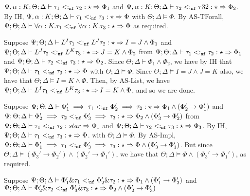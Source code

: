   $\Psi, \alpha : K ; \Theta ; \Delta \vdash \tau_1 <:_{\texttt{nf}} \tau_2 : \star \Rightarrow \Phi_1$ and
  $\Psi, \alpha : K ; \Theta ; \Delta \vdash \tau_2 <:_{\texttt{nf}} \tau32 : \star \Rightarrow \Phi_2$.
  By IH, $\Psi, \alpha : K ; \Theta ; \Delta \vdash \tau_1 <:_{\texttt{nf}} \tau_3 : \star \Rightarrow \Phi$ with $\Theta ; \Delta \vDash \Phi$. By AS-TForall,
  $\Psi ; \Theta ; \Delta \vdash \forall \alpha : K. \tau_1 <:_{\texttt{nf}} \forall \alpha : K. \tau_3 : \star \Rightarrow \Phi$ as required.
  \item[(AS-List)] Suppose $\Psi ; \Theta ; \Delta \vdash L^I \tau_1 <:_{\texttt{nf}} L^J \tau_2 : \star \Rightarrow I = J \wedge \Phi_1$ and
  $\Psi ; \Theta ; \Delta \vdash L^J \tau_2 <:_{\texttt{nf}} L^K \tau_3 : \star \Rightarrow J = K \wedge \Phi_2$
  from $\Psi ; \Theta ; \Delta \vdash \tau_1 <:_{\texttt{nf}} \tau_2 : \star \Rightarrow \Phi_1$ and
  $\Psi ; \Theta ; \Delta \vdash \tau_2 <:_{\texttt{nf}} \tau_3 : \star \Rightarrow \Phi_2$. Since $\Theta ; \Delta \vdash \Phi_1 \wedge \Phi_2$, we have by IH that
  $\Psi ; \Theta ; \Delta \vdash \tau_1 <:_{\texttt{nf}} \tau_3 : \star \Rightarrow \Phi$ with $\Theta ; \Delta \vDash \Phi$. Since $\Theta ; \Delta \vDash I = J \wedge J = K$ also,
  we have that $\Theta ; \Delta \vDash I = K \wedge \Phi$. Then, by AS-List, we have
  $\Psi ; \Theta ; \Delta \vdash L^I \tau_1 <:_{\texttt{nf}} L^K \tau_3 : \star \Rightarrow I = K \wedge \Phi$, and so we are done.
  \item[(AS-Impl)] Suppose $\Psi ; \Theta ; \Delta \vdash \Phi_1' \implies \tau_1 <:_{\texttt{nf}} \Phi_2' \implies \tau_2 : \star \Rightarrow \Phi_1 \wedge (\Phi_2' \to \Phi_1')$
  and $\Psi ; \Theta ; \Delta \vdash \Phi_2' \implies \tau_2 <:_{\texttt{nf}} \Phi_3' \implies \tau_3 : \star \Rightarrow \Phi_2 \wedge (\Phi_3' \to \Phi_2')$
  from $\Psi ; \Theta ; \Delta \vdash \tau_1 <:_{\texttt{nf}} \tau_2 : star \Rightarrow \Phi_1$ and 
  $\Psi ; \Theta ; \Delta \vdash \tau_2 <:_{\texttt{nf}} \tau_3 : \star \Rightarrow \Phi_3$. By IH,
  $\Psi ; \Theta ; \Delta \vdash \tau_1 <:_{\texttt{nf}} \tau_3 : \star \Rightarrow \Phi$. with $\Theta ; \Delta \vDash \Phi$.
  By AS-Impl, $\Psi ; \Theta ; \Delta \vdash \Phi_1' \implies \tau_1 <:_{\texttt{nf}} \Phi_3' \implies \tau_3 : \star \Rightarrow \Phi \wedge (\Phi_3' \to \Phi_1')$. But since $\Theta ; \Delta \vDash (\Phi_3' \to \Phi_2') \wedge (\Phi_2' \to \Phi_1')$, we have that $\Theta ; \Delta \vDash \Phi \wedge (\Phi_3' \to \Phi_1')$, as required.
  \item[(AS-Conj)] Suppose $\Psi ; \Theta ; \Delta \vdash \Phi_1' \& \tau_1 <:_{\texttt{nf}} \Phi_2' \& \tau_2 : \star \Rightarrow \Phi_1 \wedge (\Phi_1' \to \Phi_2')$
  and $\Psi ; \Theta ; \Delta \vdash \Phi_2' \& \tau_2 <:_{\texttt{nf}} \Phi_3' \& \tau_3 : \star \Rightarrow \Phi_2 \wedge (\Phi_2' \to \Phi_3')$
